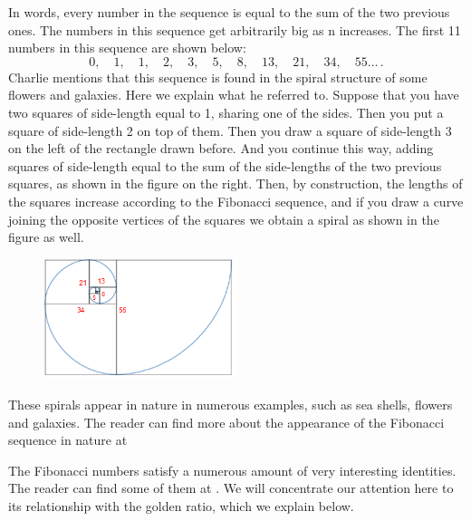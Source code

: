 

In words, \textcolor{CornellRed}{every number in the sequence is equal to the sum of the two previous ones}. The numbers in this sequence get arbitrarily big as n increases. The first 11 numbers in this sequence are shown below:
	\[
	0, \quad 1, \quad 1, \quad 2, \quad 3, \quad 5, \quad 8, \quad 13, \quad 21, \quad 34, \quad 55\ldots\, .
	\]
Charlie mentions that this sequence is found in the spiral structure of some flowers and galaxies. Here we explain what he referred to. Suppose that you have two squares of side-length equal to \textcolor{CornellRed}{1}, sharing one of the sides. Then you put a square of side-length \textcolor{CornellRed}{2} on top of them. Then you draw a square of side-length \textcolor{CornellRed}{3} on the left of the rectangle drawn before. And you continue this way, adding squares of \textcolor{CornellRed}{side-length equal to the sum of the side-lengths of the two previous squares}, as shown in the figure on the right. Then, by construction, the lengths of the squares increase according to the Fibonacci sequence, and if you draw a curve joining the opposite vertices of the squares we obtain a spiral as shown in the figure as well.
	\begin{figure}[H]
	\centering
	\includegraphics[width=0.5\textwidth]{../sections/seasons/season1/102/images/spiral.png} 
	\end{figure}
These spirals appear in nature in numerous examples, such as sea shells, flowers and galaxies. The reader can find more about the appearance of the Fibonacci sequence in nature at 


The Fibonacci numbers satisfy a numerous amount of very interesting identities. The reader can find some of them at . We will concentrate our attention here to its relationship with the golden ratio, which we explain below.


